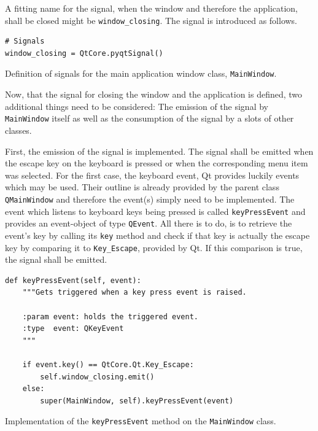 \documentclass[10pt, openright, notitlepage]{scrreprt}
\begin{document}
A fitting name for the signal, when the window and therefore the application,
shall be closed might be \texttt{window\_closing}. The signal is introduced as follows.

\begin{listing}[H]
\begin{verbatim}
# Signals
window_closing = QtCore.pyqtSignal()
\end{verbatim}
\caption{\label{main-window-signals}
Definition of signals for the main application window class, \texttt{MainWindow}.}
\end{listing}

Now, that the signal for closing the window and the application is defined, two
additional things need to be considered: The emission of the signal by
\texttt{MainWindow} itself as well as the consumption of the signal by a slots of other
classes.

First, the emission of the signal is implemented. The signal shall be emitted
when the escape key on the keyboard is pressed or when the corresponding menu
item was selected. For the first case, the keyboard event, Qt provides luckily
events which may be used. Their outline is already provided by the parent class
\texttt{QMainWindow} and therefore the event(s) simply need to be implemented. The
event which listens to keyboard keys being pressed is called \texttt{keyPressEvent} and
provides an event-object of type \texttt{QEvent}. All there is to do, is to retrieve
the event's key by calling its \texttt{key} method and check if that key is actually
the escape key by comparing it to \texttt{Key\_Escape}, provided by Qt. If this
comparison is true, the signal shall be emitted.

\begin{listing}[H]
\begin{verbatim}
def keyPressEvent(self, event):
    """Gets triggered when a key press event is raised.

    :param event: holds the triggered event.
    :type  event: QKeyEvent
    """

    if event.key() == QtCore.Qt.Key_Escape:
        self.window_closing.emit()
    else:
        super(MainWindow, self).keyPressEvent(event)
\end{verbatim}
\caption{\label{main-window-keypressevent}
Implementation of the \texttt{keyPressEvent} method on the \texttt{MainWindow} class.}
\end{listing}
\end{document}
